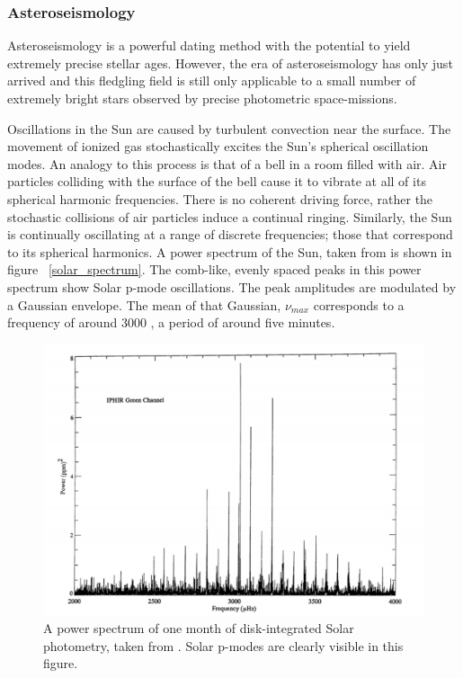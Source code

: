 
\subsubsection*{Asteroseismology}

Asteroseismology is a powerful dating method with the potential to yield
extremely precise stellar ages.
However, the era of asteroseismology has only just arrived and this fledgling
field is still only applicable to a small number of extremely bright stars
observed by precise photometric space-missions.

Oscillations in the Sun are caused by turbulent convection near the surface.
The movement of ionized gas stochastically excites the Sun's spherical
oscillation modes.
An analogy to this process is that of a bell in a room filled with air.
Air particles colliding with the surface of the bell cause it to vibrate at
all of its spherical harmonic frequencies.
There is no coherent driving force, rather the stochastic collisions of air
particles induce a continual ringing.
Similarly, the Sun is continually oscillating at a range of discrete
frequencies; those that correspond to its spherical harmonics.
A power spectrum of the Sun, taken from \citet{brown} is shown in figure
~\ref{solar_spectrum}.
The comb-like, evenly spaced peaks in this power spectrum show Solar p-mode
oscillations.
The peak amplitudes are modulated by a Gaussian envelope.
The mean of that Gaussian, $\nu_{max}$ corresponds to a frequency of around
3000 \uHz, a period of around five minutes.

\begin{figure}[p]
\begin{center}
\includegraphics[width=6in, clip=true]{figures/solar_spectrum.pdf}
\caption{A power spectrum of one month of disk-integrated Solar photometry,
taken from \citet{toutain}. Solar p-modes are clearly visible in this figure.}
\label{fig:solar_spectrum}
\end{center}
\end{figure}

